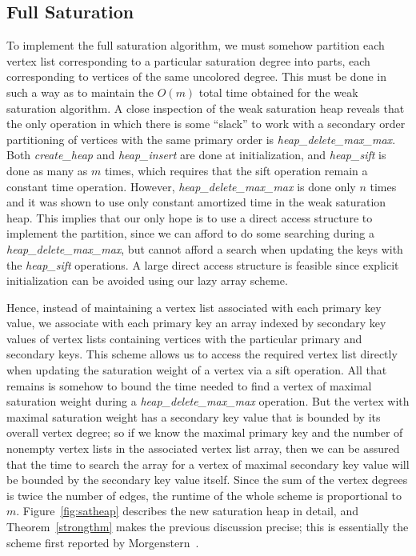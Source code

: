 \subsection{Full Saturation}
To implement the full saturation algorithm, we must somehow partition 
each vertex list corresponding to a particular saturation degree into 
parts, each corresponding to vertices of the same uncolored degree.  
This must be done in such a way as to maintain the $O(m)$ total time 
obtained for the weak saturation algorithm.  A close inspection of the
weak saturation heap reveals that the only operation in which there is 
some ``slack'' to work with a secondary order partitioning of vertices 
with the same primary order is {\em heap\_delete\_max\_max}.  
Both {\em create\_heap\/} and {\em heap\_insert\/} are done at initialization, 
and {\em heap\_sift\/} is done as many as $m$ times, which 
requires that the sift operation remain a constant time operation.  However, 
{\em heap\_delete\_max\_max\/} is done only $n$ times and it was shown to use 
only constant amortized time in the weak saturation heap.  This implies
that our only hope is to use a direct access structure to implement the 
partition, since we can afford to do some searching during a 
{\em heap\_delete\_max\_max}, but cannot afford a search when updating the 
keys with the {\em heap\_sift\/} operations.  A large direct access structure 
is feasible since explicit initialization can be avoided using our 
lazy array scheme.

Hence, instead of maintaining a vertex list associated with each primary 
key value, we associate with each primary key an array indexed by secondary 
key values of vertex lists containing vertices with the particular primary 
and secondary keys.  This scheme allows us to access the required vertex list 
directly when updating the saturation weight of a vertex via a sift operation. 
All that remains is somehow to bound the time needed to find a vertex of 
maximal saturation weight during a {\em heap\_delete\_max\_max\/} operation.  
But the vertex with maximal saturation weight has a secondary key value that is
bounded by its overall vertex degree; so if we know the maximal primary key 
and the number of nonempty vertex lists in the associated vertex list array, 
then we can be assured that the time to search the array for a vertex of 
maximal secondary key value will be bounded by the secondary key value itself. 
Since the sum of the vertex degrees is twice the 
number of edges, the runtime of the whole scheme is proportional to $m$.  
Figure~\ref{fig:satheap} describes the new saturation heap in detail, and 
Theorem~\ref{strongthm} makes the previous discussion precise; this is 
essentially the scheme first reported by Morgenstern~\cite{MOR1988}.

